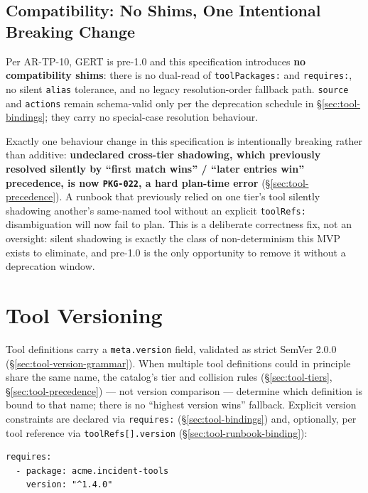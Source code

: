\subsection{Compatibility: No Shims, One Intentional Breaking Change}
\label{sec:tool-packages-compat}

Per AR-TP-10, GERT is pre-1.0 and this specification introduces \textbf{no
compatibility shims}: there is no dual-read of \texttt{toolPackages:} and
\texttt{requires:}, no silent \texttt{alias} tolerance, and no legacy
resolution-order fallback path. \texttt{source} and \texttt{actions} remain
schema-valid only per the deprecation schedule in
\S\ref{sec:tool-bindings}; they carry no special-case resolution behaviour.

Exactly one behaviour change in this specification is intentionally
breaking rather than additive: \textbf{undeclared cross-tier shadowing,
which previously resolved silently by ``first match wins'' /
``later entries win'' precedence, is now \texttt{PKG-022}, a hard plan-time
error} (\S\ref{sec:tool-precedence}). A runbook that previously relied on
one tier's tool silently shadowing another's same-named tool without an
explicit \texttt{toolRefs:} disambiguation will now fail to plan. This is a
deliberate correctness fix, not an oversight: silent shadowing is exactly
the class of non-determinism this MVP exists to eliminate, and pre-1.0 is
the only opportunity to remove it without a deprecation window.

\section{Tool Versioning}
\label{sec:tool-versioning}

Tool definitions carry a \texttt{meta.version} field, validated as strict
SemVer 2.0.0 (\S\ref{sec:tool-version-grammar}). When multiple tool
definitions could in principle share the same name, the catalog's tier and
collision rules (\S\ref{sec:tool-tiers}, \S\ref{sec:tool-precedence}) ---
not version comparison --- determine which definition is bound to that
name; there is no ``highest version wins'' fallback. Explicit version
constraints are declared via \texttt{requires:}
(\S\ref{sec:tool-bindings}) and, optionally, per tool reference via
\texttt{toolRefs[].version} (\S\ref{sec:tool-runbook-binding}):

\begin{verbatim}
requires:
  - package: acme.incident-tools
    version: "^1.4.0"
\end{verbatim}
